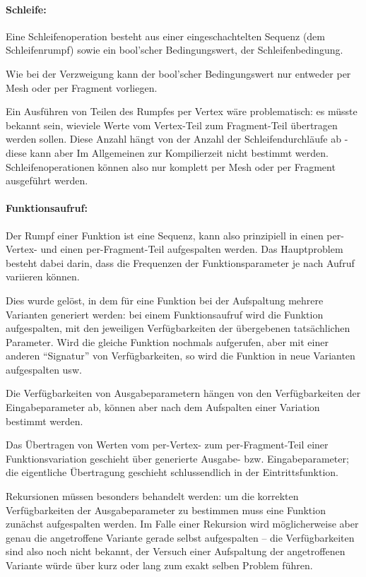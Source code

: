 \documentclass[twoside,a4paper,fleqn,12pt]{article}
\begin{document}
\paragraph{Schleife:} Eine Schleifenoperation besteht aus einer eingeschachtelten Sequenz (dem Schleifenrumpf) sowie
ein bool'scher Bedingungswert, der Schleifenbedingung.

Wie bei der Verzweigung kann der bool'scher Bedingungswert nur entweder per Mesh oder per Fragment vorliegen.

Ein Ausführen von Teilen des Rumpfes per Vertex wäre problematisch: es müsste bekannt sein, wieviele Werte vom Vertex-Teil
zum Fragment-Teil übertragen werden sollen. Diese Anzahl hängt von der Anzahl der Schleifendurchläufe ab -
diese kann aber Im Allgemeinen zur Kompilierzeit nicht bestimmt werden. Schleifenoperationen können also nur komplett
per Mesh oder per Fragment ausgeführt werden.

\paragraph{Funktionsaufruf:} Der Rumpf einer Funktion ist eine Sequenz, kann also prinzipiell in einen per-Vertex- und einen per-Fragment-Teil aufgespalten werden.
Das Hauptproblem besteht dabei darin, dass die Frequenzen der Funktionsparameter je nach Aufruf variieren können.

Dies wurde gelöst, in dem für eine Funktion bei der Aufspaltung mehrere Varianten generiert werden: bei einem Funktionsaufruf
wird die Funktion aufgespalten, mit den jeweiligen Verfügbarkeiten der übergebenen tatsächlichen Parameter. Wird die gleiche Funktion
nochmals aufgerufen, aber mit einer anderen "`Signatur"' von Verfügbarkeiten, so wird die Funktion in neue Varianten aufgespalten usw.

Die Verfügbarkeiten von Ausgabeparametern hängen von den Verfügbarkeiten der Eingabeparameter ab, können aber nach dem Aufspalten
einer Variation bestimmt werden.

Das Übertragen von Werten vom per-Vertex- zum per-Fragment-Teil einer Funktionsvariation geschieht über generierte Ausgabe- bzw.
Eingabeparameter; die eigentliche Übertragung geschieht schlussendlich in der Eintrittsfunktion.

Rekursionen müssen besonders behandelt werden: um die korrekten Verfügbarkeiten der Ausgabeparameter zu bestimmen
muss eine Funktion zunächst aufgespalten werden. Im Falle einer Rekursion wird möglicherweise aber genau die angetroffene
Variante gerade selbst aufgespalten -- die Verfügbarkeiten sind also noch nicht bekannt, der Versuch einer Aufspaltung der
angetroffenen Variante würde über kurz oder lang zum exakt selben Problem führen.
\end{document}

